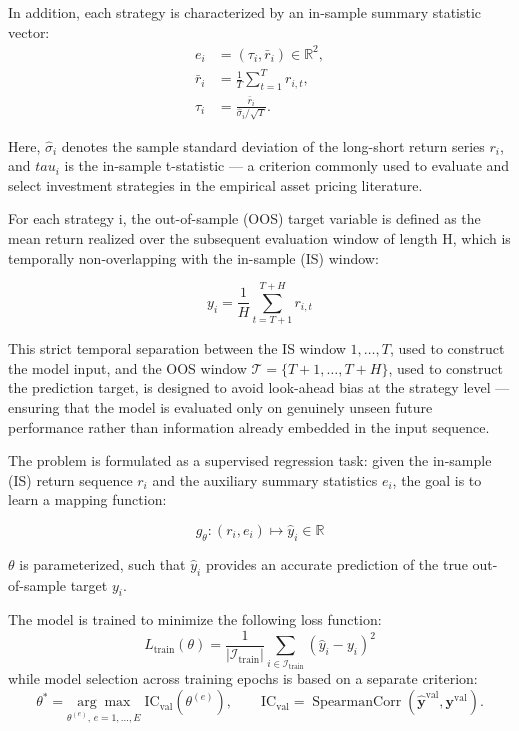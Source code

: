\documentclass[pdflatex,sn-mathphys-num]{sn-jnl}%
\theoremstyle{thmstyleone}%
\theoremstyle{thmstyletwo}%
\theoremstyle{thmstylethree}%
\begin{document}
In addition, each strategy is characterized by an in-sample summary statistic vector:
\begin{equation}
\begin{aligned}
e_i &= (\tau_i, \bar{r}_i) \in \mathbb{R}^2,\\
\bar{r}_i &= \frac{1}{T}\sum_{t=1}^{T} r_{i,t},\\
\tau_i &= \frac{\bar{r}_i}{\hat{\sigma}_i / \sqrt{T}}.
\end{aligned}
\label{eq:summary_statistics}
\end{equation}

Here, $\hat{\sigma}_i$ denotes the sample standard deviation of the long-short return series $r_i$, and $tau_i$ is the in-sample t-statistic — a criterion commonly used to evaluate and select investment strategies in the empirical asset pricing literature.

For each strategy i, the out-of-sample (OOS) target variable is defined as the mean return realized over the subsequent evaluation window of length H, which is temporally non-overlapping with the in-sample (IS) window: 

\begin{equation}
y_i = \frac{1}{H}\sum_{t=T+1}^{T+H} r_{i,t}
\label{eq:target}
\end{equation}

This strict temporal separation between the IS window ${1, \ldots, T}$, used to construct the model input, and the OOS window $\mathcal{T} = \{T+1, \ldots, T+H\}$, used to construct the prediction target, is designed to avoid look-ahead bias at the strategy level — ensuring that the model is evaluated only on genuinely unseen future performance rather than information already embedded in the input sequence.

The problem is formulated as a supervised regression task: given the in-sample (IS) return sequence $r_i$ and the auxiliary summary statistics $e_i$, the goal is to learn a mapping function:

\[
g_{\theta}: (r_i, e_i) \mapsto \hat{y}_i \in \mathbb{R}
\]

${\theta}$ is parameterized, such that $\hat{y}_i$ provides an accurate prediction of the true out-of-sample target $y_i$.

The model is trained to minimize the following loss function:
\begin{equation}
L_{\text{train}}(\theta)
=
\frac{1}{|\mathcal{I}_{\text{train}}|}
\sum_{i \in \mathcal{I}_{\text{train}}}
(\hat{y}_i - y_i)^2
\label{eq:train_loss}
\end{equation}
while model selection across training epochs is based on a separate criterion:
\begin{equation}
\theta^*
=
\underset{\theta^{(e)},\, e=1,\ldots,E}{\arg\max}
\; \mathrm{IC}_{\mathrm{val}}\!\left(\theta^{(e)}\right),
\qquad
\mathrm{IC}_{\mathrm{val}}
=
\operatorname{SpearmanCorr}
\left(
\hat{\mathbf{y}}^{\mathrm{val}},
\mathbf{y}^{\mathrm{val}}
\right).
\label{eq:model_selection}
\end{equation}
\end{document}
